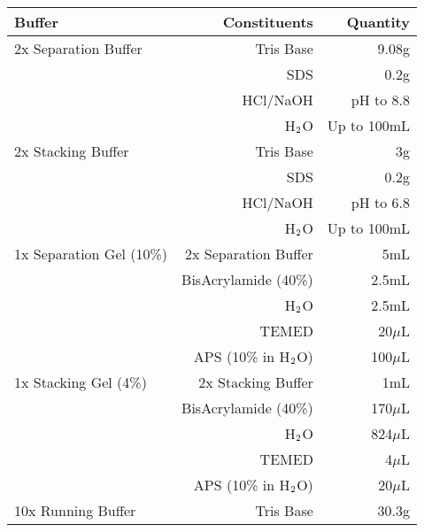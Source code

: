 \begin{table}[!htbp]
\centering
\footnotesize
\begin{tabular}{lrr}
  
  Buffer                        & Constituents                        & Quantity        \\
  \hline
  2x Separation Buffer          & Tris Base                           & 9.08g  \\
                                & SDS                                 & 0.2g  \\
                                & HCl/NaOH                            & pH to 8.8\\
                                & H$\textsubscript{2}$O               & Up to 100mL \\
  \hline
  2x Stacking Buffer            & Tris Base                           & 3g  \\
                                & SDS                                 & 0.2g  \\
                                & HCl/NaOH                            & pH to 6.8 \\
                                & H$\textsubscript{2}$O               & Up to 100mL \\
  \hline
  1x Separation Gel (10\%)      & 2x Separation Buffer                & 5mL  \\
                                & BisAcrylamide (40\%)                & 2.5mL  \\
                                & H$\textsubscript{2}$O               & 2.5mL  \\
                                & TEMED                               & 20$\mu$L  \\
                                & APS (10\% in H$\textsubscript{2}$O) & 100$\mu$L  \\
  \hline
  1x Stacking Gel (4\%)         & 2x Stacking Buffer                  & 1mL  \\
                                & BisAcrylamide (40\%)                & 170$\mu$L  \\
                                & H$\textsubscript{2}$O               & 824$\mu$L  \\
                                & TEMED                               & 4$\mu$L  \\
                                & APS (10\% in H$\textsubscript{2}$O) & 20$\mu$L  \\
  \hline
  10x Running Buffer            & Tris Base                           & 30.3g  \\

\end{tabular}
\end{table}
